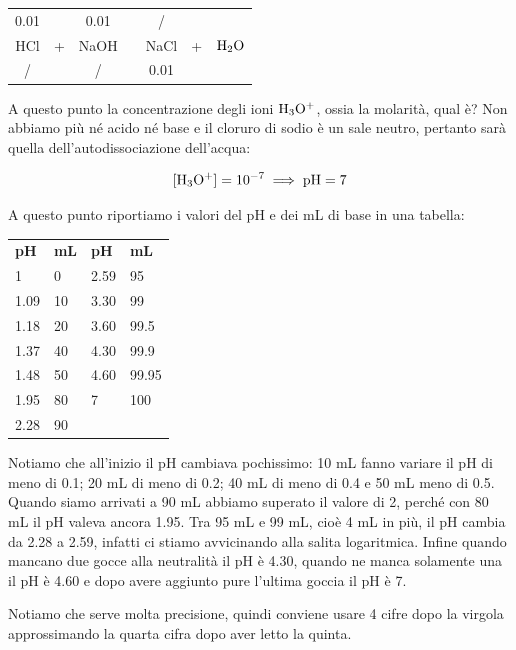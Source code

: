 \begin{center}
    \begin{tabular}{ccccccc}
        0.01 &  & 0.01  & & / & &\\
        HCl & + & NaOH & \ce{->} & NaCl & + & $\rm H_2O$\\
        / &  & / & & 0.01 & &\\
    \end{tabular}
\end{center}

A questo punto la concentrazione degli ioni $\rm H_3O^+$, ossia la molarità, qual è? Non abbiamo più né acido né base e il cloruro di sodio è un sale neutro, pertanto sarà quella dell'autodissociazione dell'acqua:

$$\rm [H_3O^+]=10^{-7} \implies pH=7$$

A questo punto riportiamo i valori del pH e dei mL di base in una tabella:

\begin{center}
    \begin{tabular}{|p{1.5cm}|p{1.5cm}||p{1.5cm}|p{1.5cm}|}
        \textbf{pH} & \textbf{mL} & \textbf{pH} & \textbf{mL}\\
        1 & 0 & 2.59 & 95\\
        1.09 & 10 & 3.30 & 99\\
        1.18 & 20 & 3.60 & 99.5\\
        1.37 & 40 & 4.30 & 99.9\\
        1.48 & 50 & 4.60 & 99.95\\
        1.95 & 80 & 7 & 100\\
        2.28 & 90 &&\\
    \end{tabular}
\end{center}

Notiamo che all'inizio il pH cambiava pochissimo: 10 mL fanno variare il pH di meno di 0.1; 20 mL di meno di 0.2; 40 mL di meno di 0.4 e 50 mL meno di 0.5. Quando siamo arrivati a 90 mL abbiamo superato il valore di 2, perché con 80 mL il pH valeva ancora 1.95. Tra 95 mL e 99 mL, cioè 4 mL in più, il pH cambia da 2.28 a 2.59, infatti ci stiamo avvicinando alla salita logaritmica. Infine quando mancano due gocce alla neutralità il pH è 4.30, quando ne manca solamente una il pH è 4.60 e dopo avere aggiunto pure l'ultima goccia il pH è 7.

Notiamo che serve molta precisione, quindi conviene usare 4 cifre dopo la virgola approssimando la quarta cifra dopo aver letto la quinta.

